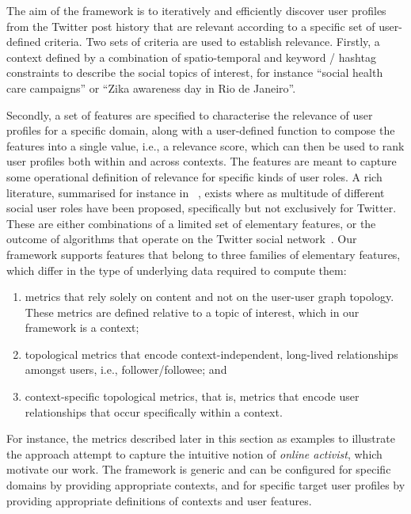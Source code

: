 \documentclass[runningheads]{llncs}
\begin{document}
The aim of the framework is to iteratively and efficiently discover user profiles from the Twitter post history that are relevant according to a specific set of user-defined criteria.
%
Two sets of criteria are used to establish relevance.
Firstly, a context defined by a combination of spatio-temporal and keyword / hashtag constraints to describe the social topics of interest, for instance ``social health care campaigns'' or ``Zika awareness day in Rio de Janeiro''.

Secondly, a set of features are specified to characterise the relevance of user profiles for a specific domain, along with a user-defined function to compose the features into a single value, i.e., a relevance score, which can then be used to rank user profiles both within and across contexts.
The features are meant to capture some operational definition of relevance for specific kinds of user roles. 
%
A rich literature, summarised for instance in ~\cite{RIQUELME2016949}, exists where as multitude of different social user roles have been proposed, specifically but not exclusively for Twitter.
These are either combinations of a limited set of elementary features, or the outcome of algorithms that operate on the Twitter social network~\cite{RIQUELME2016949}. 
Our framework supports features that belong to three families of elementary features, which differ in the type of underlying data required to compute them:
\begin{enumerate}
	\item metrics  that rely solely on content and not on the user-user graph topology. These metrics are defined relative to a topic of interest, which in our framework is a context;
	\item topological metrics that encode context-independent, long-lived relationships amongst users, i.e., follower/followee; and 
	\item context-specific topological metrics, that is, metrics that encode user relationships that occur specifically within a context.
\end{enumerate}
For instance, the metrics described later in this section as  examples to illustrate the approach attempt to capture the intuitive notion of \textit{online activist}, which motivate our work.
%
The framework is generic and can be configured for specific domains by providing appropriate contexts, and for specific target user profiles by providing appropriate definitions of contexts and user features.
\end{document}
